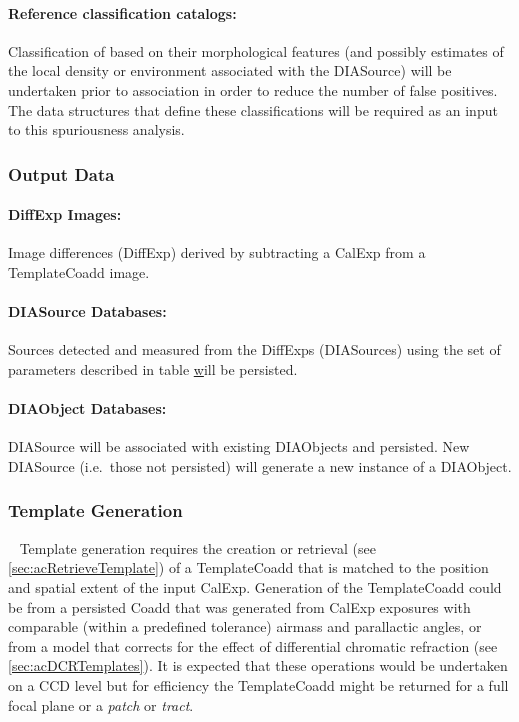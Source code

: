 \paragraph*{Reference classification catalogs:} Classification of \DIASources based on their morphological features (and possibly estimates of the local density or  environment associated with the DIASource) will be undertaken prior to association in order to reduce the number of false positives. The data structures that define these classifications will be required as an input to this spuriousness analysis. 



\subsubsection{Output Data}
\label{sec:apADOutput}

\paragraph*{DiffExp Images:} Image differences (DiffExp) derived by subtracting a CalExp from a TemplateCoadd image.

\paragraph*{DIASource Databases:} Sources detected and measured from the DiffExps (DIASources) using the set of parameters described in table \hyperref[table:ap_features] will be persisted.


\paragraph*{DIAObject Databases:} DIASource will be associated with existing DIAObjects and persisted. New DIASource (i.e.\ those not persisted) will generate a new instance of a DIAObject.


\subsubsection{Template Generation}~
\label{sec:apCRTemplates}
Template generation requires the creation or retrieval (see \ref{sec:acRetrieveTemplate}) of a TemplateCoadd that is matched to the position and spatial extent of the input CalExp. Generation of the TemplateCoadd could be from a persisted Coadd that was generated from CalExp exposures with comparable (within a predefined tolerance) airmass and parallactic angles, or from a model that corrects for the effect of  differential chromatic refraction (see \ref{sec:acDCRTemplates}). It is expected that these operations would be undertaken on a CCD level but for efficiency the TemplateCoadd might be returned for a full focal plane or a {\it patch}  or {\it tract}. 


